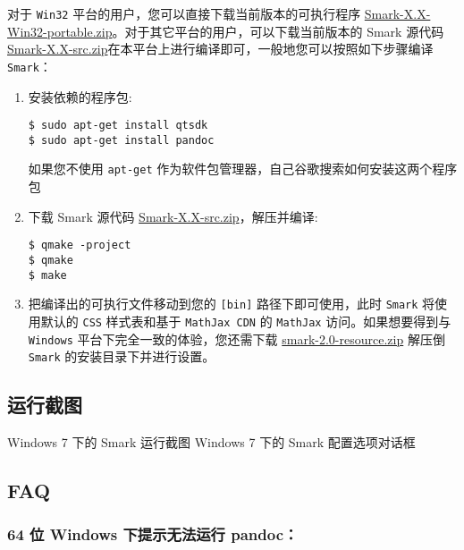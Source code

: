 对于 \texttt{Win32} 平台的用户，您可以直接下载当前版本的可执行程序
\href{http://pan.baidu.com/s/1ntMCVFV}{Smark-X.X-Win32-portable.zip}。对于其它平台的用户，可以下载当前版本的
Smark 源代码
\href{http://pan.baidu.com/s/1ntMCVFV}{Smark-X.X-src.zip}在本平台上进行编译即可，一般地您可以按照如下步骤编译
\texttt{Smark}：

\begin{enumerate}
\def\labelenumi{\arabic{enumi}.}
\item
  安装依赖的程序包:

\begin{verbatim}
$ sudo apt-get install qtsdk
$ sudo apt-get install pandoc
\end{verbatim}

  如果您不使用 \texttt{apt-get}
  作为软件包管理器，自己谷歌搜索如何安装这两个程序包
\item
  下载 Smark 源代码
  \href{http://pan.baidu.com/s/1ntMCVFV}{Smark-X.X-src.zip}，解压并编译:

\begin{verbatim}
$ qmake -project
$ qmake
$ make
\end{verbatim}
\item
  把编译出的可执行文件移动到您的 \texttt{{[}bin{]}} 路径下即可使用，此时
  \texttt{Smark} 将使用默认的 \texttt{CSS} 样式表和基于
  \texttt{MathJax\ CDN} 的 \texttt{MathJax} 访问。如果想要得到与
  \texttt{Windows} 平台下完全一致的体验，您还需下载
  \href{http://pan.baidu.com/s/1ntMCVFV}{smark-2.0-resource.zip} 解压倒
  \texttt{Smark} 的安装目录下并进行设置。
\end{enumerate}

\hypertarget{ux8fd0ux884cux622aux56fe}{%
\subsection{运行截图}\label{ux8fd0ux884cux622aux56fe}}

 Windows 7 下的 Smark 运行截图 Windows 7 下的 Smark 配置选项对话框

\hypertarget{faq}{%
\subsection{FAQ}\label{faq}}

\hypertarget{ux4f4d-windows-ux4e0bux63d0ux793aux65e0ux6cd5ux8fd0ux884c-pandoc}{%
\subsubsection{64 位 Windows 下提示无法运行
pandoc：}\label{ux4f4d-windows-ux4e0bux63d0ux793aux65e0ux6cd5ux8fd0ux884c-pandoc}}

